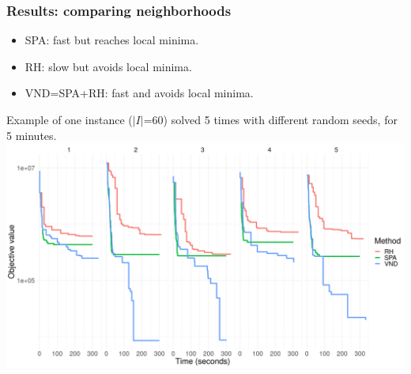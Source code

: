 %     


  

\begin{frame}
\frametitle{\textbf{Results: comparing neighborhoods}}
  \begin{itemize}
    \item SPA: fast but reaches local minima.
    \item RH: slow but avoids local minima.
    \item VND=SPA+RH: fast and avoids local minima.
  \end{itemize}

  \begin{block}{}
    Example of one instance ($|I|$=60) solved 5 times with different random seeds, for 5 minutes.
    \includegraphics[width=0.8\linewidth]{images/compare_neighbors.png}
  \end{block}
\end{frame}

